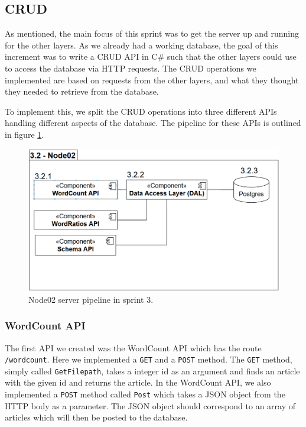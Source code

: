 \subsection{CRUD}

As mentioned, the main focus of this sprint was to get the server up and running for the other layers. 
As we already had a working database, the goal of this increment was to write a CRUD API in C\# such that the other layers could use to access the database via HTTP requests.
The CRUD operations we implemented are based on requests from the other layers, and what they thought they needed to retrieve from the database.

To implement this, we split the CRUD operations into three different APIs handling different aspects of the database. 
The pipeline for these APIs is outlined in figure \ref{Node02Sprint3}.

\begin{figure}[h]
    \centering
    \includegraphics[width=\linewidth]{Images/Node02Sprint3.PNG}
    \caption{Node02 server pipeline in sprint 3.}
    \label{Node02Sprint3}
\end{figure}

\subsubsection{WordCount API}
The first API we created was the WordCount API which has the route \texttt{/wordcount}. Here we implemented a \texttt{GET} and a \texttt{POST} method.
The \texttt{GET} method, simply called \texttt{GetFilepath}, takes a integer id as an argument and finds an article with the given id and returns the article.
In the WordCount API, we also implemented a \texttt{POST} method called \texttt{Post} which takes a JSON object from the HTTP body as a parameter. 
The JSON object should correspond to an array of articles which will then be posted to the database. 

